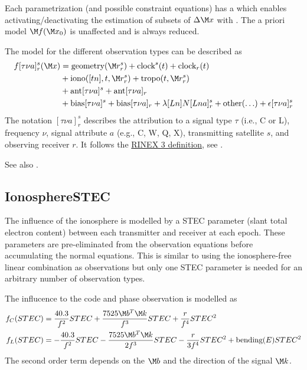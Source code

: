 Each parametrization (and possible constraint equations) has a  which enables
activating/deactivating the estimation of subsets of $\Delta\M x$ with
.
The a priori model $\M f(\M x_0)$ is unaffected and is always reduced.

The model for the different observation types can be described as
\begin{equation}\label{gnssParametrizationType:gnssFullModel}
\begin{split}
  f[\tau\nu a]_r^s(\M x) &= \text{geometry}(\M r_r^s) + \text{clock}^s(t) + \text{clock}_r(t) \\
               &+ \text{iono}([tn],t,\M r_r^s) + \text{tropo}(t,\M r_r^s) \\
               &+ \text{ant}[\tau\nu a]^s  + \text{ant}[\tau\nu a]_r \\
               &+ \text{bias}[\tau\nu a]^s + \text{bias}[\tau\nu a]_r
               + \lambda[Ln] N[Lna]_r^s + \text{other}(\ldots) + \epsilon[\tau\nu a]_r^s
\end{split}
\end{equation}
The notation $[\tau\nu a]_r^s$ describes the
attribution to a signal type $\tau$ (i.e., C or L), frequency $\nu$,
signal attribute $a$ (e.g., C, W, Q, X), transmitting satellite $s$, and observing receiver $r$.
It follows the \href{https://files.igs.org/pub/data/format/rinex305.pdf}{RINEX 3 definition},
see .

See also .


\subsection{IonosphereSTEC}\label{gnssParametrizationType:ionosphereSTEC}
The influence of the ionosphere is modelled by a STEC parameter (slant total electron content)
between each transmitter and receiver at each epoch. These parameters are pre-eliminated
from the observation equations before accumulating the normal equations.
This is similar to using the ionosphere-free linear combination as observations
but only one STEC parameter is needed for an arbitrary number of observation types.

The influcence to the code and phase observation is modelled as
\begin{equation}\label{gnssParametrizationType:IonosphereSTEC:STEC}
\begin{split}
f_C(STEC) &= \frac{40.3}{f^2}STEC + \frac{7525\M b^T\M k}{f^3}STEC +  \frac{r}{f^4}STEC^2 \\
f_L(STEC) &= -\frac{40.3}{f^2}STEC - \frac{7525\M b^T\M k}{2f^3}STEC - \frac{r}{3f^4}STEC^2 + \text{bending}(E)STEC^2
\end{split}
\end{equation}
The second order term depends on the  $\M b$
and the direction of the signal $\M k$.

